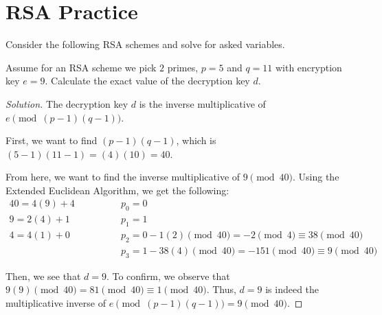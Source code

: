 \documentclass{article}
\newenvironment{solution}{\begin{proof}[Solution]}{\end{proof}}
\begin{document}
\section{RSA Practice}
Consider the following RSA schemes and solve for asked variables.

\begin{hw}
	Assume for an RSA scheme we pick $2$ primes, $p=5$ and $q=11$ with encryption key $e=9$. Calculate the exact value of the decryption key $d$. 
\end{hw}
\begin{solution}
	The decryption key $d$ is the inverse multiplicative of $e \pmod{(p-1)(q-1)}$.
	
	First, we want to find $(p-1)(q-1)$, which is $(5-1)(11-1)=(4)(10)=40$.
	
	From here, we want to find the inverse multiplicative of $9 \pmod{40}$. Using the Extended Euclidean Algorithm, we get the following:
	\begin{align*}
		40 = 4(9) + 4 &\qquad\qquad p_{0} = 0 \\
		9 = 2(4) + 1 &\qquad\qquad p_{1} = 1 \\
		4 = 4(1) + 0 &\qquad\qquad p_{2} = 0 - 1(2) \pmod{40} = -2 \pmod{4} \equiv 38 \pmod{40} \\
		&\qquad\qquad p_{3} = 1 - 38(4) \pmod{40} = -151 \pmod{40} \equiv 9 \pmod{40}
	\end{align*}

	Then, we see that $d = 9$. To confirm, we observe that $9(9) \pmod{40} = 81 \pmod{40} \equiv 1 \pmod{40}$. Thus, $d=9$ is indeed the multiplicative inverse of $e \pmod{(p-1)(q-1)} = 9 \pmod{40}$.
\end{solution}
\end{document}

